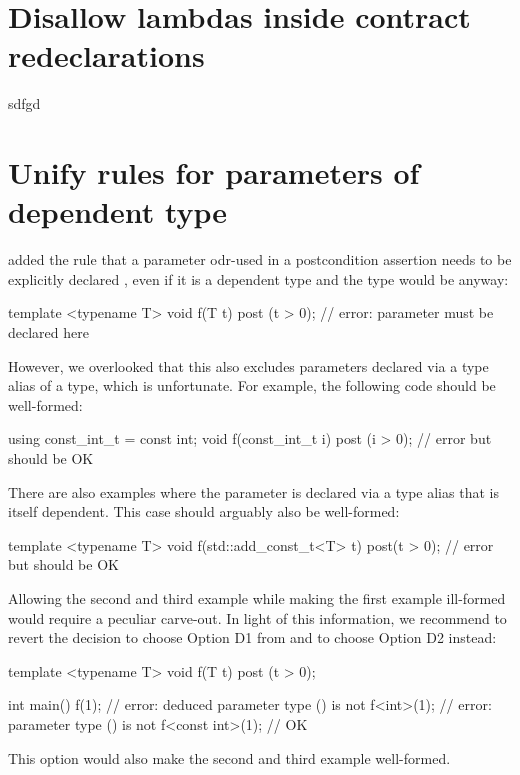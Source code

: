 \pagebreak

\section{Disallow lambdas inside contract redeclarations}

sdfgd

\section{Unify rules for parameters of dependent type}

\cite{P3489R0} added the rule that a parameter odr-used in a postcondition assertion needs to be explicitly declared , even if it is a dependent type and the type would be  anyway:

\begin{codeblock}
template <typename T>
void f(T t) post (t > 0);  // error: parameter must be declared  here
\end{codeblock}

However, we overlooked that this also excludes parameters declared via a type alias of a  type, which is unfortunate. For example, the following code should be well-formed:

\begin{codeblock}
using const_int_t = const int;
void f(const_int_t i) post (i > 0);  // error but should be OK
\end{codeblock}

There are also examples where the parameter is declared via a type alias that is itself dependent. This case should arguably also be well-formed:

\begin{codeblock}
template <typename T>
void f(std::add_const_t<T> t) post(t > 0);  // error but should be OK
\end{codeblock}

Allowing the second and third example while making the first example ill-formed would require a peculiar carve-out. In light of this information, we recommend to revert the decision to choose Option D1 from \cite{P3489R0} and to choose Option D2 instead:
\begin{codeblock}
template <typename T>
void f(T t) post (t > 0);  

int main() {
  f(1);              // error: deduced parameter type () is not 
  f<int>(1);         // error: parameter type () is not 
  f<const int>(1);   // OK
}
\end{codeblock}
This option would also make the second and third example well-formed.

